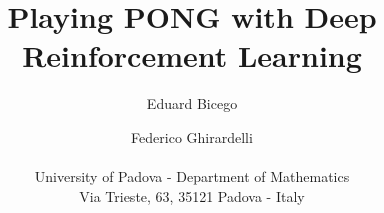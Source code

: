 \documentclass[letterpaper]{article} %
\begin{document}
%
\title{Playing PONG with Deep Reinforcement Learning}

\author{Eduard Bicego \and Federico Ghirardelli\\\\
University of Padova - Department of Mathematics\\
Via Trieste, 63, 35121 Padova - Italy\\
}

\maketitle











\end{document}
